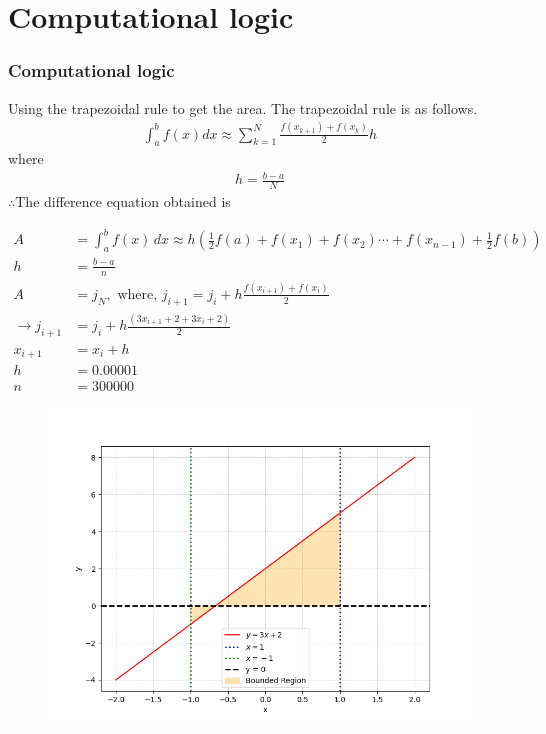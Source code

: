 \documentclass{beamer}
\providecommand{\brak}[1]{\ensuremath{\left(#1\right)}}
\theoremstyle{remark}
\numberwithin{equation}{section}
\begin{document}
\section{Computational logic}
\begin{frame}[fragile]
    \frametitle{Computational logic}
    Using the trapezoidal rule to get the area. The trapezoidal rule is as follows.
\begin{align}
    \int^{b}_{a} f\brak{x}dx\approx \sum^{N}_{k=1}\frac{f\brak{x_{k+1}}+f\brak{x_{k}}}{2}h
\end{align}
where
\begin{align}
    h=\frac{b-a}{N}
\end{align}
$\therefore$The difference equation obtained is\\
\end{frame}
\begin{frame}[fragile]
    \begin{align}
    A &= \int_a^b f\brak{x}\, dx \approx h\brak{\frac{1}{2}f\brak{a} + f\brak{x_1} + f\brak{x_2} \cdots + f\brak{x_{n-1}} + \frac{1}{2}f\brak{b}}\\
     h &= \frac{b-a}{n}\\
    A &= j_N, \text{ where, } j_{i + 1} = j_i + h\frac{f\brak{x_{i+1}} + f\brak{x_i}}{2}\\ 
        \xrightarrow{} j_{i + 1} &= j_i + h\frac{\brak{3x_{i+1}+2+3x_{i}+2}}{2}\\
    x_{i+1} &= x_i + h\\
    h&=0.00001\\
    n&=300000
    \end{align}
\end{frame}
\begin{frame}[fragile]
    \begin{figure}[h]
    \centering
    \includegraphics[width=\columnwidth]{figs/fig.png}
 \end{figure}
\end{frame}
\end{document}
